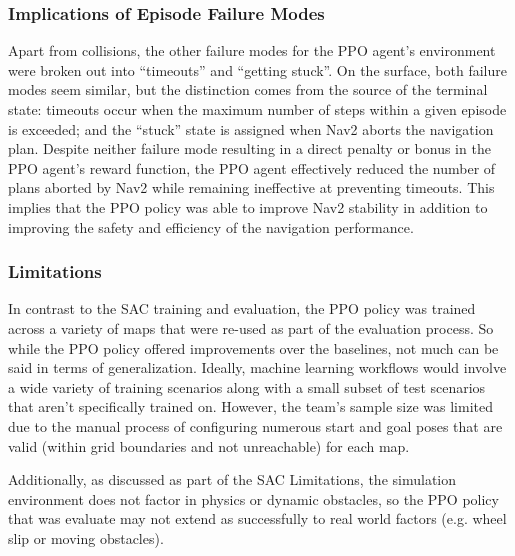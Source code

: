 \documentclass[conference]{IEEEtran}
\begin{document}
        \subsubsection{Implications of Episode Failure Modes}
        Apart from collisions, the other failure modes for the PPO agent's environment were broken out into ``timeouts'' and ``getting stuck''. On the surface, both failure modes seem similar, but the distinction comes from the source of the terminal state: timeouts occur when the maximum number of steps within a given episode is exceeded; and the ``stuck'' state is assigned when Nav2 aborts the navigation plan. Despite neither failure mode resulting in a direct penalty or bonus in the PPO agent's reward function, the PPO agent effectively reduced the number of plans aborted by Nav2 while remaining ineffective at preventing timeouts. This implies that the PPO policy was able to improve Nav2 stability in addition to improving the safety and efficiency of the navigation performance.

        \subsubsection{Limitations}
        In contrast to the SAC training and evaluation, the PPO policy was trained across a variety of maps that were re-used as part of the evaluation process. So while the PPO policy offered improvements over the baselines, not much can be said in terms of generalization. Ideally, machine learning workflows would involve a wide variety of training scenarios along with a small subset of test scenarios that aren't specifically trained on. However, the team's sample size was limited due to the manual process of configuring numerous start and goal poses that are valid (within grid boundaries and not unreachable) for each map.

        Additionally, as discussed as part of the SAC Limitations, the simulation environment does not factor in physics or dynamic obstacles, so the PPO policy that was evaluate may not extend as successfully to real world factors (e.g. wheel slip or moving obstacles).
\end{document}
